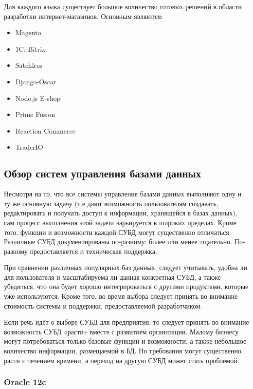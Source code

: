 Для каждого языка существует большое количество готовых решений в области разработки интернет-магазинов. Основным являются:

\begin{itemize}
	\item Magento
	\item 1C: Bitrix
	\item Satchless
	\item Django-Oscar
	\item Node.js E-shop
	\item Prime Fusion
	\item Reaction Commerce
	\item TraderIO
\end{itemize}

\subsection{Обзор систем управления базами данных}

Несмотря на то, что все системы управления базами данных выполняют одну и ту же основную задачу (т.е дают возможность пользователям создавать, редактировать и получать доступ к информации, хранящейся в базах данных), сам процесс выполнения этой задачи варьируется в широких пределах. Кроме того, функции и возможности каждой СУБД могут существенно отличаться. Различные СУБД документированы по-разному: более или менее тщательно. По-разному предоставляется и техническая поддержка.

При сравнении различных популярных баз данных, следует учитывать, удобна ли для пользователя и масштабируема ли данная конкретная СУБД, а также убедиться, что она будет хорошо интегрироваться с другими продуктами, которые уже используются. Кроме того, во время выбора следует принять во внимание стоимость системы и поддержки, предоставляемой разработчиком.

Если речь идёт о выборе СУБД для предприятия, то следует принять во внимание возможность СУБД «расти» вместе с развитием организации. Малому бизнесу могут потребоваться только базовые функции и возможности, а также небольшое количество информации, размещаемой в БД. Но требования могут существенно расти с течением времени, а переход на другую СУБД может стать проблемой.

\subsubsection{Oracle 12c}

